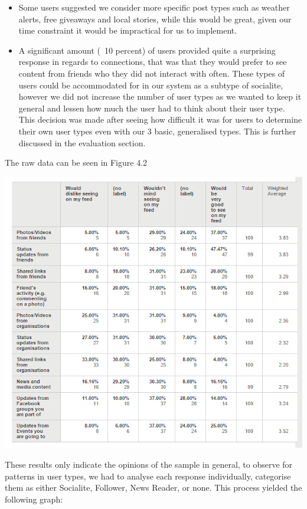 \begin{itemize}
\item Some users suggested we consider more specific post types such as weather alerts, free giveaways and local stories, while this would be great, given our time constraint it would be impractical for us to implement.
\item A significant amount (~10 percent) of users provided quite a surprising response in regards to connections, that was that they would prefer to see content from friends who they did not interact with often. These types of users could be accommodated for in our system as a subtype of socialite, however we did not increase the number of user types as we wanted to keep it general and lessen how much the user had to think about their user type. This decision was made after seeing how difficult it was for users to determine their own user types even with our 3 basic, generalised types. This is further discussed in the evaluation section. 
\end{itemize}

The raw data can be seen in Figure 4.2

\begin{center}
\includegraphics[scale=0.8]{images/surveyTable.png}
\end{center}

These results only indicate the opinions of the sample in general, to observe for patterns in user types, we had to analyse each response individually, categorise them as either Socialite, Follower, News Reader, or none. This process yielded the following graph:

